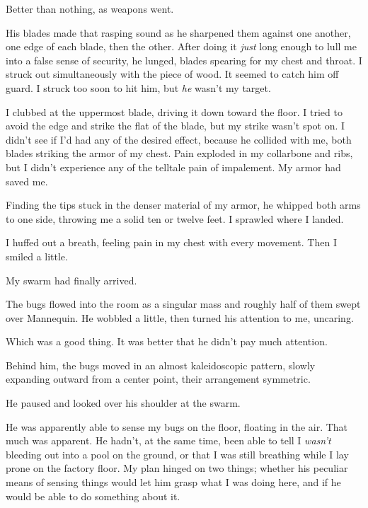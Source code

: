 Better than nothing, as weapons went.



His blades made that rasping sound as he sharpened them against one another, one edge of each blade, then the other.  After doing it \emph{just} long enough to lull me into a false sense of security, he lunged, blades spearing for my chest and throat.  I struck out simultaneously with the piece of wood.  It seemed to catch him off guard.  I struck too soon to hit him, but \emph{he} wasn't my target.



I clubbed at the uppermost blade, driving it down toward the floor.  I tried to avoid the edge and strike the flat of the blade, but my strike wasn't spot on.  I didn't see if I'd had any of the desired effect, because he collided with me, both blades striking the armor of my chest.  Pain exploded in my collarbone and ribs, but I didn't experience any of the telltale pain of impalement.  My armor had saved me.



Finding the tips stuck in the denser material of my armor, he whipped both arms to one side, throwing me a solid ten or twelve feet.  I sprawled where I landed.



I huffed out a breath, feeling pain in my chest with every movement.  Then I smiled a little.



My swarm had finally arrived.



The bugs flowed into the room as a singular mass and roughly half of them swept over Mannequin.  He wobbled a little, then turned his attention to me, uncaring.



Which was a good thing.  It was better that he didn't pay much attention.



Behind him, the bugs moved in an almost kaleidoscopic pattern, slowly expanding outward from a center point, their arrangement symmetric.



He paused and looked over his shoulder at the swarm.



He was apparently able to sense my bugs on the floor, floating in the air.  That much was apparent.  He hadn't, at the same time, been able to tell I \emph{wasn't} bleeding out into a pool on the ground, or that I was still breathing while I lay prone on the factory floor.  My plan hinged on two things; whether his peculiar means of sensing things would let him grasp what I was doing here, and if he would be able to do something about it.




